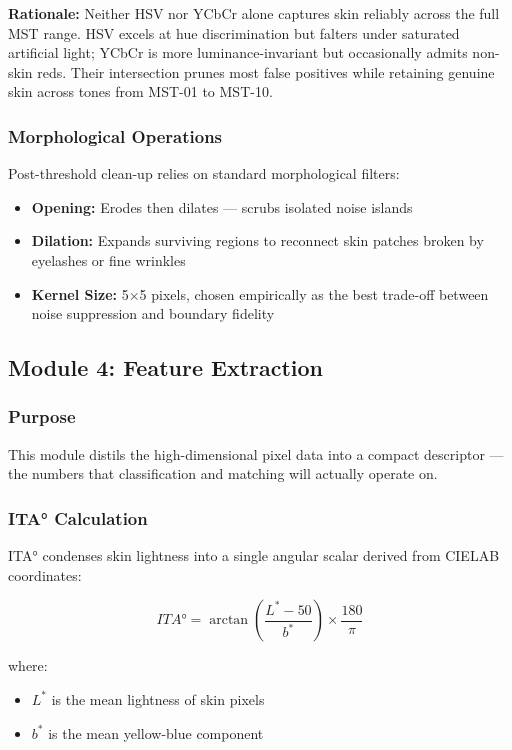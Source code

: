 \textbf{Rationale:} Neither HSV nor YCbCr alone captures skin reliably across the full MST range. HSV excels at hue discrimination but falters under saturated artificial light; YCbCr is more luminance-invariant but occasionally admits non-skin reds. Their intersection prunes most false positives while retaining genuine skin across tones from MST-01 to MST-10.

\subsubsection{Morphological Operations}

Post-threshold clean-up relies on standard morphological filters:

\begin{itemize}
    \item \textbf{Opening:} Erodes then dilates — scrubs isolated noise islands
    \item \textbf{Dilation:} Expands surviving regions to reconnect skin patches broken by eyelashes or fine wrinkles
    \item \textbf{Kernel Size:} 5$\times$5 pixels, chosen empirically as the best trade-off between noise suppression and boundary fidelity
\end{itemize}

\subsection{Module 4: Feature Extraction}

\subsubsection{Purpose}
This module distils the high-dimensional pixel data into a compact descriptor — the numbers that classification and matching will actually operate on.

\subsubsection{ITA° Calculation}

ITA° condenses skin lightness into a single angular scalar derived from CIELAB coordinates:

\begin{equation}
ITA° = \arctan\left(\frac{L^* - 50}{b^*}\right) \times \frac{180}{\pi}
\end{equation}

where:
\begin{itemize}
    \item $L^*$ is the mean lightness of skin pixels
    \item $b^*$ is the mean yellow-blue component
\end{itemize}

